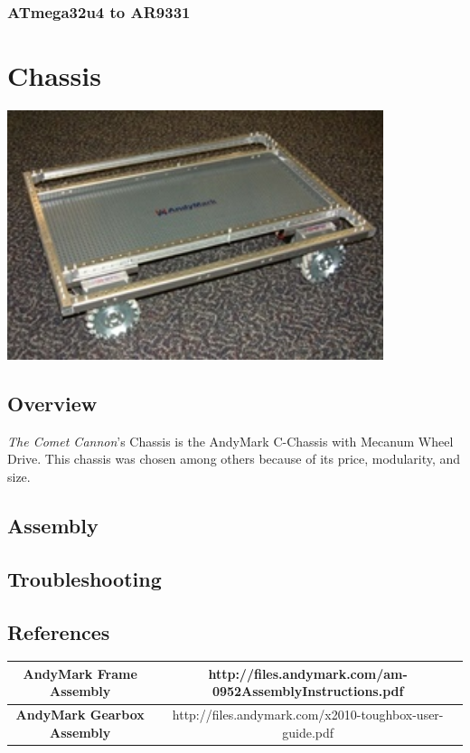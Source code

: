 \documentclass[letterpaper,12pt]{article}
\newcommand{\botname}{\textit{The Comet Cannon}}
\begin{document}
\subsubsection{ATmega32u4 to AR9331}
\label{sec:mega_ath_msg}

\section{Chassis}
\begin{center}
    \includegraphics[width=11cm]{pics/chassis/andymark_chassis.jpg}
\end{center}

\subsection{Overview}
\botname's Chassis is the AndyMark C-Chassis with Mecanum Wheel Drive. This chassis was chosen among others because of its price, modularity, and size.

\subsection{Assembly}
\subsection{Troubleshooting}
\subsection{References}

\begin{table}[h!]
  \begin{tabular}{| c | c |}
    \hline
    \textbf{AndyMark Frame Assembly} &  http://files.andymark.com/am-0952AssemblyInstructions.pdf\\
    \hline
    \textbf{AndyMark Gearbox Assembly} &  http://files.andymark.com/x2010-toughbox-user-guide.pdf\\
    \hline
  \end{tabular}
  \label{tab:fire_cmd_msg}
\end{table}
\end{document}
